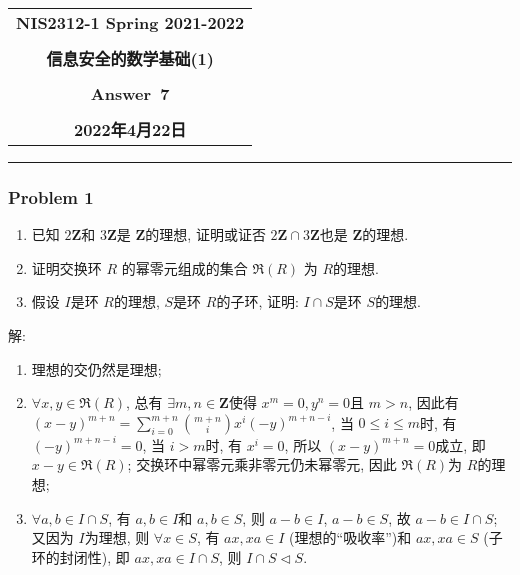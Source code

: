 \documentclass[a4paper,12pt]{ctexart}
\newcommand{\Z}{\mathbf{Z}}
\begin{document}
  \begin{center}

  \vspace{-0.3in}
  \begin{tabular}{c}
    \textbf{\Large NIS2312-1 Spring 2021-2022} \\
    \textbf{\Large  } \\
    \textbf{\Large  信息安全的数学基础(1)} \\
    \textbf{\Large  } \\
    \textbf{\Large  Answer~7} \\
    \textbf{\Large  } \\
    \textbf{\Large 2022年4月22日} \\
  \end{tabular}
  \end{center}
  \noindent
  \rule{\linewidth}{0.4pt}

\subsubsection*{Problem 1}
    \begin{enumerate}
      \item 已知 $ 2\Z $和 $ 3\Z $是 $ \Z $的理想, 证明或证否 $ 2\Z\cap 3\Z $也是 $ \Z $的理想.
      \item 证明交换环 $ R $ 的幂零元组成的集合 $ \mathfrak{R} (R) $ 为 $ R $的理想.
      \item 假设 $ I $是环 $ R $的理想, $ S $是环 $ R $的子环, 证明: $ I\cap S $是环 $ S $的理想.
    \end{enumerate}

    解: \begin{enumerate}
      \item 理想的交仍然是理想;
      \item $ \forall x,y\in \mathfrak{R} (R) $, 总有 $ \exists m,n\in\Z $使得 $ x^m=0,y^n=0 $且 $ m>n $, 因此有
      $ (x-y)^{m+n}=\sum_{i=0}^{m+n}\binom{m+n}{i}x^i(-y)^{m+n-i} $, 当 $ 0\leq i\leq m $时, 有 $ (-y)^{m+n-i}=0 $,
      当 $ i>m $时, 有 $ x^{i}=0 $, 所以 $ (x-y)^{m+n}=0 $成立, 即 $ x-y\in\mathfrak{R} (R)  $; 交换环中幂零元乘非零元仍未幂零元,
      因此 $ \mathfrak{R} (R) $为 $ R $的理想;
      \item $ \forall a,b\in I\cap S $, 有 $ a,b\in I $和 $ a,b\in S $, 则 $ a-b\in I $, $ a-b\in S $, 故 $ a-b\in I\cap S $;
      又因为 $ I $为理想, 则 $ \forall x\in S $, 有 $ ax,xa\in I $ (理想的``吸收率'')和 $ ax,xa\in S $ (子环的封闭性), 即 $ ax,xa\in I\cap S $,
      则 $ I\cap S\triangleleft S $. 
    \end{enumerate}
\end{document}
